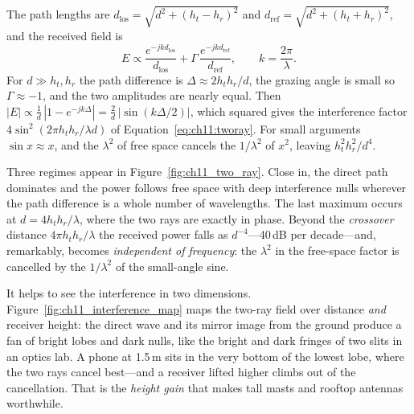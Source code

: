 \begin{deeper}
The path lengths are $d_{\text{los}}=\sqrt{d^2+(h_t-h_r)^2}$ and
$d_{\text{ref}}=\sqrt{d^2+(h_t+h_r)^2}$, and the received field is
\begin{equation}
E\propto\frac{e^{-jkd_{\text{los}}}}{d_{\text{los}}}+\Gamma\,\frac{e^{-jkd_{\text{ref}}}}{d_{\text{ref}}},
\qquad k=\frac{2\pi}{\lambda}.
\end{equation}
For $d\gg h_t,h_r$ the path difference is $\Delta\approx2h_th_r/d$, the grazing angle is small so
$\Gamma\approx-1$, and the two amplitudes are nearly equal. Then
$|E|\propto\frac{1}{d}\,|1-e^{-jk\Delta}|=\frac{2}{d}\,|\sin(k\Delta/2)|$, which squared gives the
interference factor $4\sin^2(2\pi h_th_r/\lambda d)$ of Equation~\eqref{eq:ch11:tworay}. For small
arguments $\sin x\approx x$, and the $\lambda^2$ of free space cancels the $1/\lambda^2$ of
$x^2$, leaving $h_t^2h_r^2/d^4$.
\end{deeper}

Three regimes appear in Figure~\ref{fig:ch11_two_ray}. Close in, the direct path dominates and
the power follows free space with deep interference nulls wherever the path difference is a
whole number of wavelengths. The last maximum occurs at $d=4h_th_r/\lambda$, where the two
rays are exactly in phase. Beyond the \emph{crossover} distance $4\pi h_th_r/\lambda$ the
received power falls as $d^{-4}$---40\,dB per decade---and, remarkably, becomes
\emph{independent of frequency}: the $\lambda^2$ in the free-space factor is cancelled by the
$1/\lambda^2$ of the small-angle sine.


It helps to see the interference in two dimensions. Figure~\ref{fig:ch11_interference_map} maps
the two-ray field over distance \emph{and} receiver height: the direct wave and its mirror image
from the ground produce a fan of bright lobes and dark nulls, like the bright and dark fringes of
two slits in an optics lab. A phone at 1.5\,m sits in the very bottom of the lowest lobe, where the
two rays cancel best---and a receiver lifted higher climbs out of the cancellation. That is the
\emph{height gain} that makes tall masts and rooftop antennas worthwhile.

